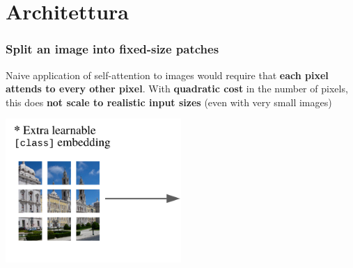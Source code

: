 \section{Architettura}


\begin{frame}
\frametitle{Split an image into fixed-size patches}

Naive application of self-attention to images would require that \textbf{each pixel attends to every other pixel}. With \textbf{quadratic cost} in the number of pixels, this does \textbf{not scale to realistic input sizes} (even with very small images)

\begin{center}
    \includegraphics[width=0.5\textwidth]{img/2-section/Patching.png} 
\end{center}
\end{frame}





